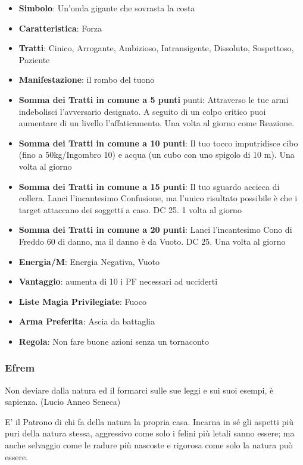 \begin{multicols}{2}
\begin{itemize}[leftmargin=*] \setlength{\itemsep}{0pt}
\item \textbf{Simbolo}: Un'onda gigante che sovrasta la costa
\item \textbf{Caratteristica}: Forza
\item \textbf{Tratti}: Cinico, Arrogante, Ambizioso, Intransigente, Dissoluto, Sospettoso, Paziente
\item \textbf{Manifestazione}: il rombo del tuono
\item \textbf{Somma dei Tratti in comune a 5 punti} punti: Attraverso le tue armi indebolisci l'avversario designato. A seguito di un colpo critico puoi aumentare di un livello l'affaticamento. Una volta al giorno come Reazione.
\item \textbf{Somma dei Tratti in comune a 10 punti}: Il tuo tocco imputridisce cibo (fino a 50kg/Ingombro 10) e acqua (un cubo con uno spigolo di 10 m). Una volta al giorno
\item \textbf{Somma dei Tratti in comune a 15 punti}: Il tuo sguardo accieca di collera. Lanci l'incantesimo Confusione, ma l'unico risultato possibile è che i target attaccano dei soggetti a caso. DC 25. 1 volta al giorno
\item \textbf{Somma dei Tratti in comune a 20 punti}: Lanci l'incantesimo Cono di Freddo 60 di danno, ma il danno è da Vuoto. DC 25. Una volta al giorno
\item \textbf{Energia/M}: Energia Negativa, Vuoto
\item \textbf{Vantaggio}: aumenta di 10 i PF necessari ad ucciderti
\item \textbf{Liste Magia Privilegiate}: Fuoco
\item \textbf{Arma Preferita}: Ascia da battaglia
\item \textbf{Regola}: Non fare buone azioni senza un tornaconto
\end{itemize}

\subsubsection{Efrem}\label{efrem}\hypertarget{efrem}{}

\begin{enfasi}{
Non deviare dalla natura ed il formarci sulle sue leggi e sui suoi esempi, è sapienza. (Lucio Anneo Seneca)
}\end{enfasi}

E' il Patrono di chi fa della natura la propria casa. Incarna in sé gli aspetti più puri della natura stessa, aggressivo come solo i felini più letali sanno essere; ma anche selvaggio come le radure più nascoste e rigorosa come solo la natura può essere.


\end{multicols}
